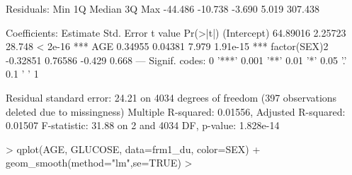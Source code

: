\documentclass{article}
\begin{document}
\begin{Schunk}
\begin{Soutput}
Residuals:
    Min      1Q  Median      3Q     Max 
-44.486 -10.738  -3.690   5.019 307.438 

Coefficients:
             Estimate Std. Error t value Pr(>|t|)    
(Intercept)  64.89016    2.25723  28.748  < 2e-16 ***
AGE           0.34955    0.04381   7.979 1.91e-15 ***
factor(SEX)2 -0.32851    0.76586  -0.429    0.668    
---
Signif. codes:  0 '***' 0.001 '**' 0.01 '*' 0.05 '.' 0.1 ' ' 1

Residual standard error: 24.21 on 4034 degrees of freedom
  (397 observations deleted due to missingness)
Multiple R-squared:  0.01556,	Adjusted R-squared:  0.01507 
F-statistic: 31.88 on 2 and 4034 DF,  p-value: 1.828e-14
\end{Soutput}
\begin{Sinput}
> qplot(AGE, GLUCOSE, data=frm1_du, color=SEX) + geom_smooth(method="lm",se=TRUE)
> 
\end{Sinput}
\end{Schunk}
\end{document}

